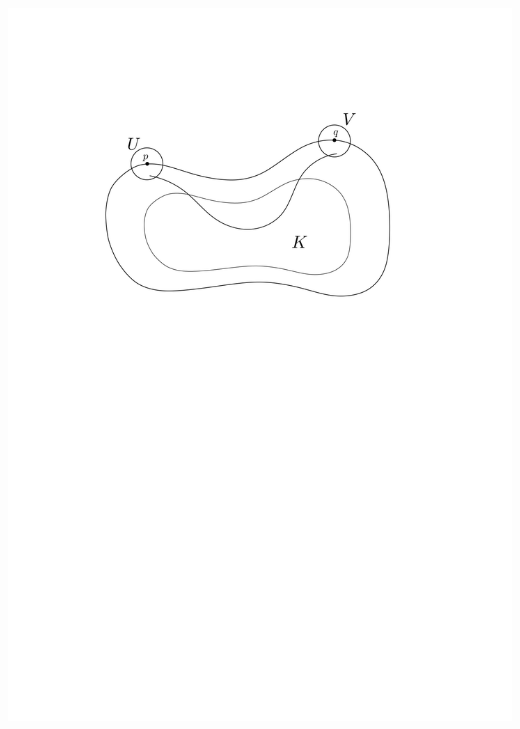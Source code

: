 \begin{frame}[t]
{    \includegraphics[width=1.05\textwidth, trim=0 18cm 0 3cm]{vis1.png}
  }
\end{frame}
